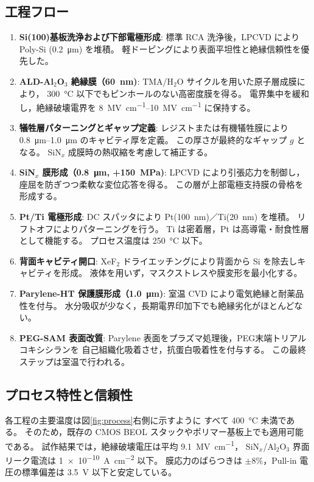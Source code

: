 \subsection{工程フロー}
\begin{enumerate}[label=(\arabic*), leftmargin=6mm]
\item \textbf{Si(100)基板洗浄および下部電極形成}:  
標準 RCA 洗浄後，LPCVD により Poly-Si (\SI{0.2}{\micro\meter}) を堆積。
軽ドーピングにより表面平坦性と絶縁信頼性を優先した。

\item \textbf{ALD-Al$_2$O$_3$ 絶縁膜（\SI{60}{\nano\meter})}:  
TMA/H$_2$O サイクルを用いた原子層成膜により，
\SI{300}{\celsius} 以下でもピンホールのない高密度膜を得る。
電界集中を緩和し，絶縁破壊電界を \SIrange{8}{10}{\mega\volt\per\centi\meter} に保持する。

\item \textbf{犠牲層パターニングとギャップ定義}:  
レジストまたは有機犠牲膜により \SIrange{0.8}{1.0}{\micro\meter} のキャビティ厚を定義。
この厚さが最終的なギャップ $g$ となる。
SiN$_x$ 成膜時の熱収縮を考慮して補正する。

\item \textbf{SiN$_x$ 膜形成（\SI{0.8}{\micro\meter}, +\SI{150}{\mega\pascal})}:  
LPCVD により引張応力を制御し，座屈を防ぎつつ柔軟な変位応答を得る。
この層が上部電極支持膜の骨格を形成する。

\item \textbf{Pt/Ti 電極形成}:  
DC スパッタにより Pt(\SI{100}{\nano\meter})／Ti(\SI{20}{\nano\meter}) を堆積。
リフトオフによりパターニングを行う。
Ti は密着層，Pt は高導電・耐食性層として機能する。
プロセス温度は \SI{250}{\celsius} 以下。

\item \textbf{背面キャビティ開口}:  
XeF$_2$ ドライエッチングにより背面から Si を除去しキャビティを形成。
液体を用いず，マスクストレスや膜変形を最小化する。

\item \textbf{Parylene-HT 保護膜形成（\SI{1.0}{\micro\meter})}:  
室温 CVD により電気絶縁と耐薬品性を付与。
水分吸収が少なく，長期電界印加下でも絶縁劣化がほとんどない。

\item \textbf{PEG-SAM 表面改質}:  
Parylene 表面をプラズマ処理後，PEG末端トリアルコキシシランを
自己組織化吸着させ，抗蛋白吸着性を付与する。
この最終ステップは室温で行われる。
\end{enumerate}

\subsection{プロセス特性と信頼性}
各工程の主要温度は図\ref{fig:process}右側に示すように
すべて \SI{400}{\celsius} 未満である。
そのため，既存の CMOS BEOL スタックやポリマー基板上でも適用可能である。
試作結果では，絶縁破壊電圧は平均 \SI{9.1}{\mega\volt\per\centi\meter}，
SiN$_x$/Al$_2$O$_3$ 界面リーク電流は \SI{1e-10}{\ampere\per\centi\meter\squared} 以下。
膜応力のばらつきは $\pm$8\%，Pull-in 電圧の標準偏差は \SI{3.5}{\volt} 以下と安定している。

